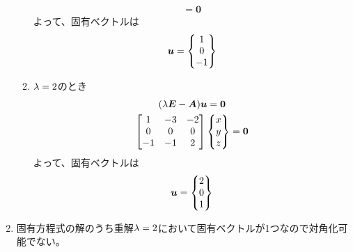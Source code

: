 \begin{ans*}
\begin{enumerate}[label=(\arabic*)]
\begin{enumerate}[label=(\roman*)]
\begin{gather}
{        }
        =\bm{0}
      \end{gather}
      よって、固有ベクトルは
      \begin{gather}
        {\bm{u}} =
        \begin{Bmatrix}
          1 \\ 0 \\ -1
        \end{Bmatrix}
      \end{gather}
      \item ${\lambda} = 2$のとき
      \begin{gather}
        ({\lambda}\bm{E} - \bm{A}){\bm{u}} = \bm{0} \\
        \begin{bmatrix}
          1& -3& -2 \\
          0& 0& 0 \\
          -1& -1& 2
        \end{bmatrix}
        \begin{Bmatrix}
          x \\ y \\ z
        \end{Bmatrix}
        =\bm{0}
      \end{gather}
      よって、固有ベクトルは
      \begin{gather}
        {\bm{u}} =
        \begin{Bmatrix}
          2 \\ 0 \\ 1
        \end{Bmatrix}
      \end{gather}
    \end{enumerate}
    \item 固有方程式の解のうち重解${\lambda} = 2$において固有ベクトルが1つなので対角化可能でない。
  \end{enumerate}
\end{ans*}
